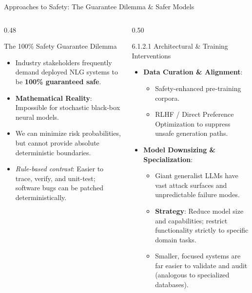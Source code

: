 \documentclass[aspectratio=169, 10pt]{beamer}
\begin{document}
\begin{frame}{Approaches to Safety: The Guarantee Dilemma \& Safer Models}
  \begin{columns}[T]
    \begin{column}{0.48\textwidth}
      \begin{alertbox}{The 100\% Safety Guarantee Dilemma}
        \begin{itemize}
          \item Industry stakeholders frequently demand deployed NLG systems to be \textbf{100\% guaranteed safe}.
          \item \textbf{Mathematical Reality}: Impossible for stochastic black-box neural models.
          \item We can minimize risk probabilities, but cannot provide absolute deterministic boundaries.
          \item \textit{Rule-based contrast}: Easier to trace, verify, and unit-test; software bugs can be patched deterministically.
        \end{itemize}
      \end{alertbox}
    \end{column}

    \begin{column}{0.50\textwidth}
      \begin{block}{6.1.2.1 Architectural \& Training Interventions}
        \begin{itemize}
          \item \textbf{Data Curation \& Alignment}:
          \begin{itemize}
            \item Safety-enhanced pre-training corpora.
            \item RLHF / Direct Preference Optimization to suppress unsafe generation paths.
          \end{itemize}
          \item \textbf{Model Downsizing \& Specialization}:
          \begin{itemize}
            \item Giant generalist LLMs have vast attack surfaces and unpredictable failure modes.
            \item \textbf{Strategy}: Reduce model size and capabilities; restrict functionality strictly to specific domain tasks.
            \item Smaller, focused systems are far easier to validate and audit (analogous to specialized databases).
          \end{itemize}
        \end{itemize}
      \end{block}
    \end{column}
  \end{columns}
\end{frame}
\end{document}
